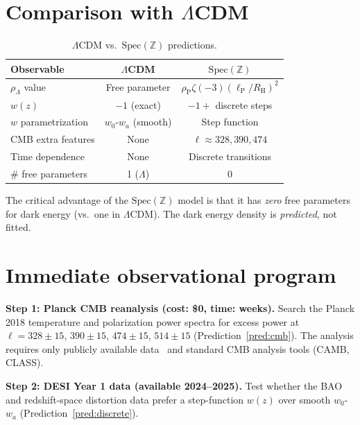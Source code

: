 \documentclass[11pt,a4paper]{article}
\newcommand{\Spec}{\mathrm{Spec}}
\newcommand{\lP}{\ell_{\mathrm{P}}}
\newcommand{\RH}{R_{\mathrm{H}}}
\newcommand{\rhoP}{\rho_{\mathrm{P}}}
\begin{document}
\section{Comparison with $\Lambda$CDM}

\begin{table}[h]
\centering
\caption{$\Lambda$CDM vs.\ $\Spec(\mathbb{Z})$ predictions.}
\label{tab:comparison}
\small
\begin{tabular}{@{}p{3.5cm}cc@{}}
\toprule
Observable & $\Lambda$CDM & $\Spec(\mathbb{Z})$ \\
\midrule
$\rho_\Lambda$ value & Free parameter & $\rhoP \zeta(-3)(\lP/\RH)^2$ \\
$w(z)$ & $-1$ (exact) & $-1 +$ discrete steps \\
$w$ parametrization & $w_0$-$w_a$ (smooth) & Step function \\
CMB extra features & None & $\ell \approx 328, 390, 474$ \\
Time dependence & None & Discrete transitions \\
\midrule
\# free parameters & 1 ($\Lambda$) & 0 \\
\bottomrule
\end{tabular}
\end{table}

The critical advantage of the $\Spec(\mathbb{Z})$ model is that
it has \emph{zero} free parameters for dark energy (vs.\ one
in $\Lambda$CDM). The dark energy density is \emph{predicted},
not fitted.

\section{Immediate observational program}

\textbf{Step 1: Planck CMB reanalysis (cost: \$0, time: weeks).}
Search the Planck 2018 temperature and polarization power spectra
for excess power at $\ell = 328 \pm 15$, $390 \pm 15$, $474 \pm 15$,
$514 \pm 15$ (Prediction~\ref{pred:cmb}).
The analysis requires only publicly available data~\cite{Planck2018}
and standard CMB analysis tools (CAMB, CLASS).

\textbf{Step 2: DESI Year 1 data (available 2024--2025).}
Test whether the BAO and redshift-space distortion data prefer
a step-function $w(z)$ over smooth $w_0$-$w_a$
(Prediction~\ref{pred:discrete}).
\end{document}
